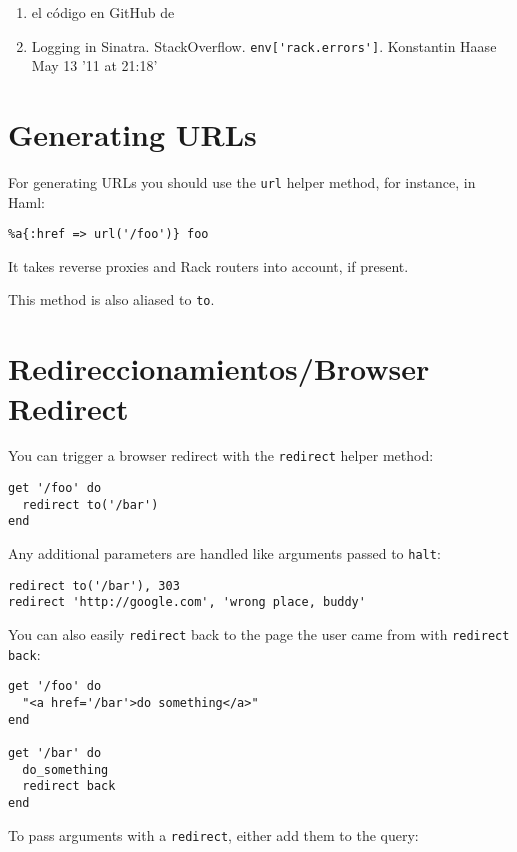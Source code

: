 \begin{enumerate}
\item 
 el código en GitHub de 
\item Logging in Sinatra. StackOverflow.
\verb|env['rack.errors']|.  Konstantin Haase May 13 '11 at 21:18'
\end{enumerate}

\section{Generating URLs}
For generating URLs you should use the \verb|url|
helper method, for instance, in Haml:

\begin{verbatim}
%a{:href => url('/foo')} foo
\end{verbatim}
It takes reverse proxies and Rack routers into account, if present.

This method is also aliased to \verb|to|.


\section{Redireccionamientos/Browser Redirect}

You can trigger a browser redirect with the \verb|redirect| helper method:

\begin{verbatim}
get '/foo' do
  redirect to('/bar')
end
\end{verbatim}
Any additional parameters are handled like arguments passed to \verb|halt|:

\begin{verbatim}
redirect to('/bar'), 303
redirect 'http://google.com', 'wrong place, buddy'
\end{verbatim}
You can also easily \verb|redirect| back to the page the user came from with \verb|redirect back|:

\begin{verbatim}
get '/foo' do
  "<a href='/bar'>do something</a>"
end

get '/bar' do
  do_something
  redirect back
end
\end{verbatim}
To pass arguments with a \verb|redirect|, either add them to the query:

